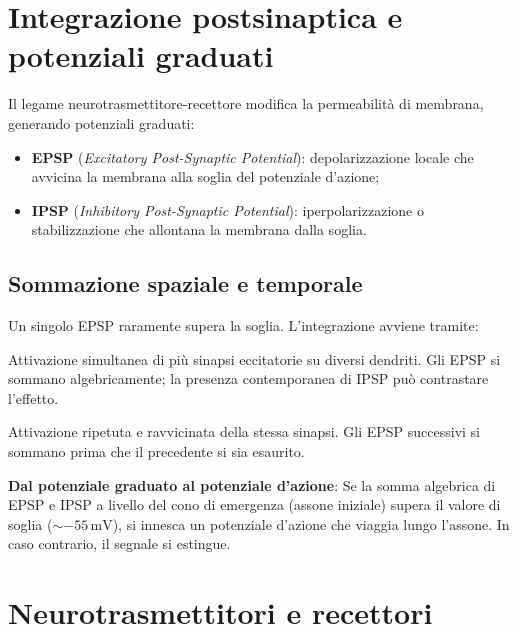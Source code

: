 \documentclass[11pt,a4paper,italian,twoside]{report}
\theoremstyle{definition} %
\begin{document}
\section{Integrazione postsinaptica e potenziali graduati}
\label{sec:integrazione_posts}

Il legame neurotrasmettitore-recettore modifica la permeabilità di membrana, generando potenziali graduati:
\begin{itemize}
  \item \textbf{EPSP} (\textit{Excitatory Post-Synaptic Potential}): depolarizzazione locale che avvicina la membrana alla soglia del potenziale d'azione;
  \item \textbf{IPSP} (\textit{Inhibitory Post-Synaptic Potential}): iperpolarizzazione o stabilizzazione che allontana la membrana dalla soglia.
\end{itemize}

\subsection{Sommazione spaziale e temporale}
\label{subsec:sommazione}

Un singolo EPSP raramente supera la soglia. L'integrazione avviene tramite:
\begin{description}[leftmargin=1.5em,style=nextline]
  \item[Sommazione spaziale] Attivazione simultanea di più sinapsi eccitatorie su diversi dendriti. Gli EPSP si sommano algebricamente; la presenza contemporanea di IPSP può contrastare l'effetto.
  \item[Sommazione temporale] Attivazione ripetuta e ravvicinata della stessa sinapsi. Gli EPSP successivi si sommano prima che il precedente si sia esaurito.
\end{description}

\begin{esempio}
\textbf{Dal potenziale graduato al potenziale d'azione}:
Se la somma algebrica di EPSP e IPSP a livello del cono di emergenza (assone iniziale) supera il valore di soglia ($\sim -55\,\mathrm{mV}$), si innesca un potenziale d'azione che viaggia lungo l'assone. In caso contrario, il segnale si estingue.
\end{esempio}

\section{Neurotrasmettitori e recettori}
\label{sec:neurotrasmettitori}
\end{document}

